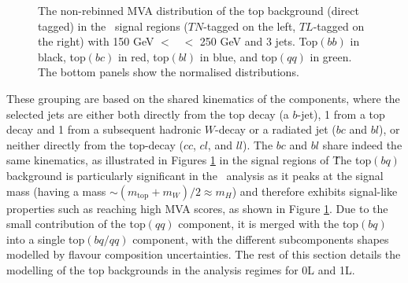 \begin{figure}[!htbp]
    \centering
      \caption{The non-rebinned MVA distribution of the top background (direct tagged) in the \vhc\ signal regions ($TN$-tagged on the left, $TL$-tagged on the right) with 150 GeV $<$ \ptv\ $<$ 250 GeV and 3 jets. Top$(bb)$ in black, top$(bc)$ in red, top$(bl)$ in blue, and top$(qq)$ in green. The bottom panels show the normalised distributions.} 
      \label{fig:topflavdistr_VHcc}
\end{figure}

These grouping are based on the shared kinematics of the components, where the selected jets are either both directly from the top decay (a $b$-jet), 1 from a top decay and 1 from a subsequent hadronic $W$-decay or a radiated jet ($bc$ and $bl$), or neither directly from the top-decay ($cc$, $cl$, and $ll$). The $bc$ and $bl$ share indeed the same kinematics, as illustrated in Figures \ref{fig:topflavdistr_VHcc} in the signal regions of \vhc\. The top$(bq)$ background is particularly significant in the \vhc\ analysis as it peaks at the signal mass (having a mass $\sim (m_{\text{top}} + m_W) / 2 \approx m_H$) and therefore exhibits signal-like properties such as reaching high MVA scores, as shown in Figure \ref{fig:topflavdistr_VHcc}. Due to the small contribution of the top$(qq)$ component, it is merged with the top$(bq)$ into a single top$(bq/qq)$ component, with the different subcomponents shapes modelled by flavour composition uncertainties. The rest of this section details the modelling of the top backgrounds in the analysis regimes for 0L and 1L.

